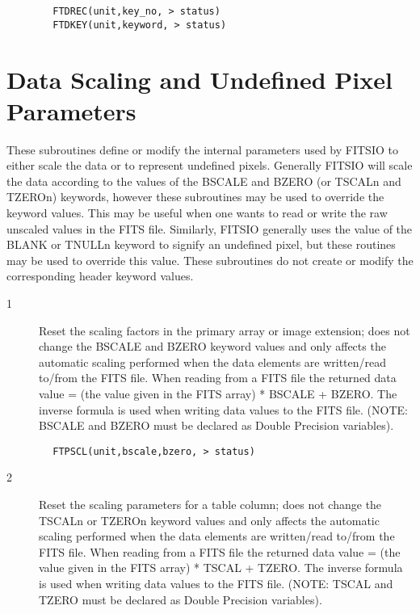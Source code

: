 \documentclass[11pt]{book}
\begin{document}
\begin{verbatim}
        FTDREC(unit,key_no, > status)
        FTDKEY(unit,keyword, > status)
\end{verbatim}


\section{Data Scaling and Undefined Pixel Parameters  \label{FTPSCL}}

These subroutines define or modify the internal parameters used by
FITSIO to either scale the data or to represent undefined pixels.
Generally FITSIO will scale the data according to the values of the BSCALE
and BZERO (or TSCALn and TZEROn) keywords, however these subroutines
may be used to override the keyword values.  This may be useful when
one wants to read or write the raw unscaled values in the FITS file.
Similarly, FITSIO generally uses the value of the BLANK or TNULLn
keyword to signify an undefined pixel, but these routines may be used
to override this value.  These subroutines do not create or modify the
corresponding header keyword values.


\begin{description}
\item[1 ] Reset the scaling factors in the primary array or image extension; does
    not change the BSCALE and BZERO keyword values and only affects the
    automatic scaling performed when the data elements are written/read
    to/from the FITS file.   When reading from a FITS file the returned
    data value = (the value given in the FITS array) * BSCALE + BZERO.
    The inverse formula is used when writing data values to the FITS
    file.  (NOTE: BSCALE and BZERO must be declared as Double Precision
   variables).
\end{description}

\begin{verbatim}
        FTPSCL(unit,bscale,bzero, > status)
\end{verbatim}

\begin{description}
\item[2 ] Reset the scaling parameters for a table column; does not change
    the TSCALn or TZEROn keyword values and only affects the automatic
    scaling performed when the data elements are written/read to/from
    the FITS file.  When reading from a FITS file the returned data
    value = (the value given in the FITS array) * TSCAL + TZERO.  The
    inverse formula is used when writing data values to the FITS file.
    (NOTE: TSCAL and TZERO  must be declared as Double Precision
   variables).
\end{description}
\end{document}
